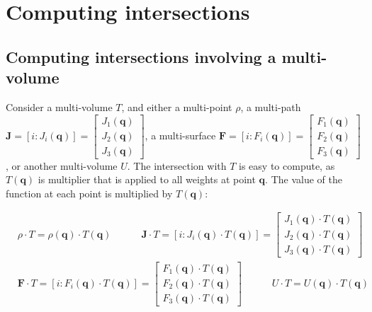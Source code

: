 \section{Computing intersections}

\subsection{Computing intersections involving a multi-volume}

Consider a multi-volume \(T\), and either a multi-point \(\rho\), a multi-path \(\mathbf{J} = [i : J_i(\mathbf{q})] = \begin{bmatrix} J_1(\mathbf{q}) \\ J_2(\mathbf{q}) \\ J_3(\mathbf{q}) \end{bmatrix}\), a multi-surface \(\mathbf{F} = [i : F_i(\mathbf{q})] = \begin{bmatrix} F_1(\mathbf{q}) \\ F_2(\mathbf{q}) \\ F_3(\mathbf{q}) \end{bmatrix}\), or another multi-volume \(U\). The intersection with \(T\) is easy to compute, as \(T(\mathbf{q})\) is multiplier that is applied to all weights at point \(\mathbf{q}\). The value of the function at each point is multiplied by \(T(\mathbf{q})\):

\begin{thm}
\begin{align*}
& \rho \cdot T = \rho(\mathbf{q}) \cdot T(\mathbf{q}) 
\quad\quad\quad \mathbf{J} \cdot T = [i : J_i(\mathbf{q}) \cdot T(\mathbf{q})] = \begin{bmatrix} J_1(\mathbf{q}) \cdot T(\mathbf{q}) \\ J_2(\mathbf{q}) \cdot T(\mathbf{q}) \\ J_3(\mathbf{q}) \cdot T(\mathbf{q}) \end{bmatrix} \\ 
& \mathbf{F} \cdot T = [i : F_i(\mathbf{q}) \cdot T(\mathbf{q})] = \begin{bmatrix} F_1(\mathbf{q}) \cdot T(\mathbf{q}) \\ F_2(\mathbf{q}) \cdot T(\mathbf{q}) \\ F_3(\mathbf{q}) \cdot T(\mathbf{q}) \end{bmatrix}  
\quad\quad\quad U \cdot T = U(\mathbf{q}) \cdot T(\mathbf{q})
\end{align*}
\end{thm}



